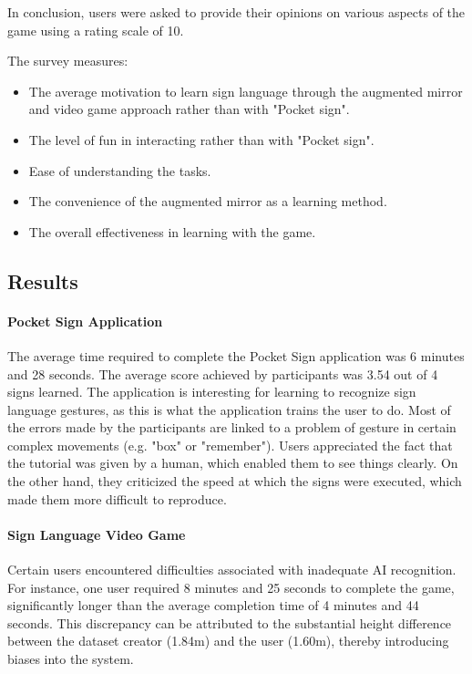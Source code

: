 In conclusion, users were asked to provide their opinions on various aspects of the game using a rating scale of 10. 

The survey measures: 
\begin{itemize}
    \item The average motivation to learn sign language through the augmented mirror and video game approach rather than with "Pocket sign".
    \item The level of fun in interacting rather than with "Pocket sign".
    \item Ease of understanding the tasks.
    \item The convenience of the augmented mirror as a learning method.
    \item The overall effectiveness in learning with the game.
  \end{itemize}

\subsection{Results}

\paragraph{Pocket Sign Application}

The average time required to complete the Pocket Sign application was 6 minutes and 28 seconds. The average score achieved by participants was 3.54 out of 4 signs learned. The application is interesting for learning to recognize sign language gestures, as this is what the application trains the user to do. Most of the errors made by the participants are linked to a problem of gesture in certain complex movements (e.g. "box" or "remember"). Users appreciated the fact that the tutorial was given by a human, which enabled them to see things clearly. On the other hand, they criticized the speed at which the signs were executed, which made them more difficult to reproduce.

\paragraph{Sign Language Video Game}

Certain users encountered difficulties associated with inadequate AI recognition. For instance, one user required 8 minutes and 25 seconds to complete the game, significantly longer than the average completion time of 4 minutes and 44 seconds. This discrepancy can be attributed to the substantial height difference between the dataset creator (1.84m) and the user (1.60m), thereby introducing biases into the system.

